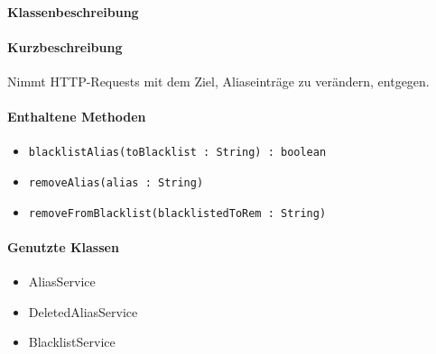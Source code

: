 \paragraph*{Klassenbeschreibung}%
\paragraph*{Kurzbeschreibung}
Nimmt HTTP-Requests mit dem Ziel, Aliaseinträge zu verändern, entgegen.
\paragraph*{Enthaltene Methoden}
\begin{itemize}
    \item \texttt{blacklistAlias(toBlacklist : String) : boolean}
    \item \texttt{removeAlias(alias : String)}
    \item \texttt{removeFromBlacklist(blacklistedToRem : String)}
\end{itemize}
\paragraph*{Genutzte Klassen}
\begin{itemize}
    \item AliasService
    \item DeletedAliasService
    \item BlacklistService
\end{itemize}